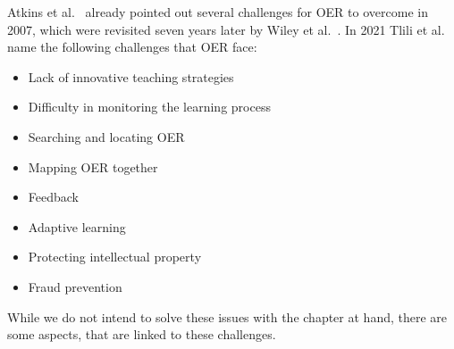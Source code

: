 Atkins et al.~\cite{atkins:2007:review} already pointed out several challenges for OER to overcome in 2007, which were revisited seven years later by Wiley et al.~\cite{wiley:2014:oer}. In 2021  Tlili et al.~\cite{tlili:2021:towards} name the following challenges that OER face:
\begin{itemize}
	\vspace{-0.3cm}\item Lack of innovative teaching strategies
	\vspace{-0.3cm}\item Difficulty in monitoring the learning process
	\vspace{-0.3cm}\item Searching and locating OER
	\vspace{-0.3cm}\item Mapping OER together
	\vspace{-0.3cm}\item Feedback
	\vspace{-0.3cm}\item Adaptive learning
	\vspace{-0.3cm}\item Protecting intellectual property
	\vspace{-0.3cm}\item Fraud prevention
\end{itemize}

While we do not intend to solve these issues with the chapter at hand, there are some aspects, that are linked to these challenges.

